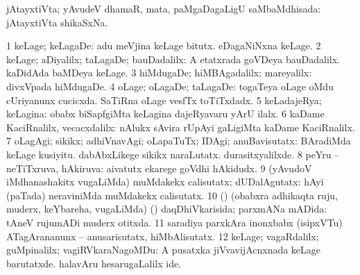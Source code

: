 \bentry
{} 
\gl{\gu}
\expl{}
\bmng
 jAtayxtiVta; yAvudeV dhamaR, mata, paMgaDagaLigU saMbaMdhisada:  jAtayxtiVta shikaSxNa. 
\emng
\eentry

\bentry
{} 
\gl{\upa}
\bmng
\bnum
\num{1} keLage; keLagaDe:  adu meVjina keLage bitutx.  eDagaNiNxna keLage. 
\num{2} keLage; aDiyalilx; taLagaDe; bauDadalilx:  A etatxrada goVDeya bauDadalilx.  kaDidAda baMDeya keLage. 
\num{3} hiMdugaDe; hiMBAgadalilx; mareyalilx:  divxVpada hiMdugaDe. 
\num{4} oLage; oLagaDe; taLagaDe:  togaTeya oLage oMdu cUriyanunx cucicxda.  SaTiRna oLage vesfTx toTiTxdadx. 
\num{5} keLadajeRya; keLagina:  obabx biSapfgiMta keLagina dajeRyavaru yArU ilalx. 
\num{6} kaDame KaciRnalilx, vecacxdalilx:  nAlukx sAvira rUpAyi gaLigiMta kaDame KaciRnalilx. 
\num{7} oLagAgi; sikikx; adhiVnavAgi; oLapaTuTx; IDAgi; anuBavisutatx:  BAradiMda keLage kusiyitu.  dabAbxLikege sikikx naraLutatx.  durasitxyalilxde. 
\num{8} peYru -- neTiTxruva, hAkiruva:  aivatutx ekarege goVdhi hAkidudx. 
\num{9} (yAvudoV iMdhanashakitx \mo vugaLiMda) muMdakekx calisutatx; dUDalAgutatx:  hAyi (paTada) neraviniMda muMdakekx calisutatx. 
\num{10} (\pArxparx) (obabxra adhikaqta ruju, muderx, keYbareha, \mo vugaLiMda) (\kanmu) daqDhiVkarisida; parxmANa mADida:  tAneV rujumADi muderx otitxda. 
\num{11} saradiya parxkAra inonxbabx (isipxVTu) ATagArananunx -- anusarisutatx, hiMbAlisutatx. 
\num{12} keLage; vagaRdalilx; guMpinalilx; vagiRVkaraNagoMDu:  A pusatxka jiVvavijAcnxnada keLage barutatxde.  halavAru hesarugaLalilx ide. 
\enum
\emng

